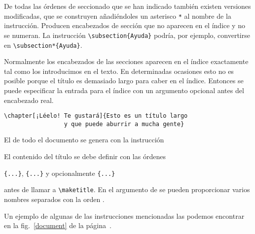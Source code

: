 De  todas  las órdenes  de  seccionado  que  se han  indicado  también
existen  versiones  modificadas,  que se  construyen  añadiéndoles  un
asterisco \verb|*|  al nombre de la  instrucción. Producen encabezados
de  sección  que  no  aparecen  en  el índice  y  no  se  numeran.  La
instrucción \verb|\subsection{Ayuda}| podría, por ejemplo, convertirse
en \verb|\subsection*{Ayuda}|.

Normalmente los  encabezados de  las secciones  aparecen en  el índice
exactamente tal  como los  introducimos en  el texto.  En determinadas
ocasiones esto no es posible porque  el título es demasiado largo para
caber en el  índice. Entonces se puede especificar la  entrada para el
índice con un argumento opcional antes del encabezado real.

\begin{code}
\verb|\chapter[¡Léelo! Te gustará]{Esto es un título largo|\\
\verb|                 y que puede aburrir a mucha gente}|
\end{code}

El  de todo el documento se genera con la instrucción

\begin{command}
\end{command}

\noindent El contenido del título se debe definir con las órdenes

\begin{command}
\verb|{...}|, \verb|{...}| 
y opcionalmente \verb|{...}| 
\end{command}

\noindent  antes de  llamar a  \verb|\maketitle|. En  el argumento  de
  se pueden  proporcionar varios  nombres separados  con la
orden .

Un ejemplo  de algunas  de las  instrucciones mencionadas  las podemos
encontrar en la fig.~\ref{document} de la página~\pageref{document}.

